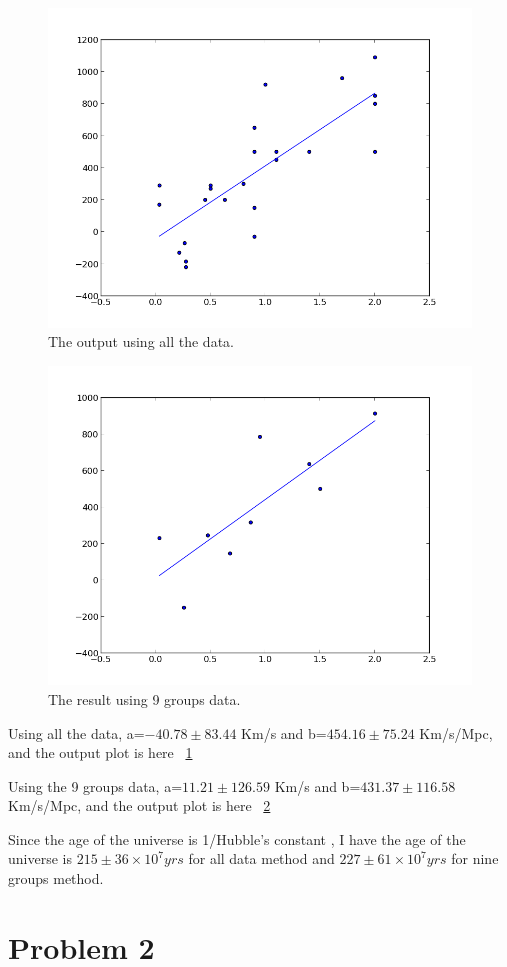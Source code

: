 \documentclass[11pt,letterpaper]{article}
\begin{document}
\begin{figure}
\begin{center}
\includegraphics[width=0.6\linewidth,angle=0]{all.png}
\caption{The output using all the data.}
\label{figure2}
\end{center}
\end{figure}

\begin{figure}
\begin{center}
\includegraphics[width=0.6\linewidth,angle=0]{group.png}
\caption{The result using 9 groups data.}
\label{figure3}
\end{center}
\end{figure}

Using all the data, a=$-40.78 \pm 83.44$ Km/s and b=$454.16 \pm 75.24$ Km/s/Mpc, and the output plot is here ~\ref{figure2}

Using the 9 groups data, a=$11.21 \pm 126.59$ Km/s and b=$431.37 \pm 116.58$ Km/s/Mpc, and the output plot is here ~\ref{figure3} 

Since the age of the universe is 1/Hubble's constant \cite{hubblewiki} , I have the age of the universe is $215 \pm 36\times10^7 yrs$ for all data method and $227 \pm 61\times10^7 yrs$ for nine groups method.

\newpage
\section{Problem 2}
\end{document}

